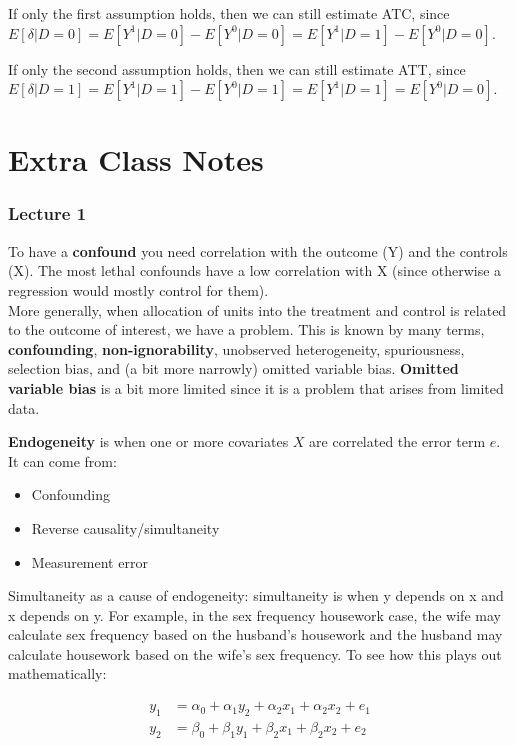 \documentclass[12 pt, leqno]{article}
\begin{document}
If only the first assumption holds, then we can still estimate ATC, since $E[\delta|D = 0] = E[Y^1|D=0] - E[Y^0|D=0] = E[Y^1|D=1] - E[Y^0|D=0] $.

If only the second assumption holds, then we can still estimate ATT, since $E[\delta|D = 1] = E[Y^1|D=1] - E[Y^0|D=1] = E[Y^1|D=1] = E[Y^0|D=0]$. 

\section{Extra Class Notes}

\subsubsection{Lecture 1}

To have a \textbf{confound} you need correlation with the outcome (Y) and the controls (X). The most lethal confounds have a low correlation with X (since otherwise a regression would mostly control for them). \\

More generally, when allocation of units into the treatment and control is related to the outcome of interest, we have a problem. This is known by many terms, \textbf{confounding}, \textbf{non-ignorability}, unobserved heterogeneity, spuriousness, selection bias, and (a bit more narrowly) omitted variable bias. \textbf{Omitted variable bias} is a bit more limited since it is a problem that arises from limited data.

\textbf{Endogeneity} is when one or more covariates $X$ are correlated the error term $e$. It can come from:

\begin{itemize}
\item Confounding
\item Reverse causality/simultaneity
\item Measurement error
\end{itemize}

Simultaneity as a cause of endogeneity: simultaneity is when y depends on x and x depends on y. For example, in the sex frequency housework case, the wife may calculate sex frequency based on the husband's housework and the husband may calculate housework based on the wife's sex frequency. To see how this plays out mathematically:

\begin{align*}
y_1 &= \alpha_0 + \alpha_1 y_2 + \alpha_2 x_1 + \alpha_2 x_2 + e_1 \\
y_2 &= \beta_0 + \beta_1 y_1 + \beta_2 x_1 + \beta_2 x_2 + e_2
\end{align*}
\end{document}
